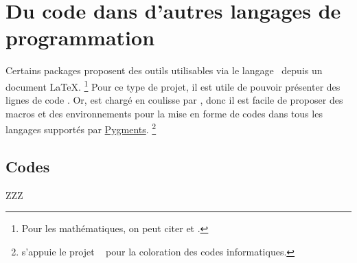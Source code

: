 \documentclass{tutodoc}
\begin{document}
\section{Du code dans d'autres langages de programmation}

Certains packages proposent des outils utilisables via le langage \lua\ depuis un document \LaTeX.%
\footnote{
	Pour les mathématiques, on peut citer  et .
}
Pour ce type de projet, il est utile de pouvoir présenter des lignes de code \lua. Or,  est chargé en coulisse par \thisproj, donc il est facile de proposer des macros et des environnements pour la mise en forme de codes dans tous les langages supportés par \href{https://pygments.org/}{Pygments}.%
\footnote{
	 s'appuie le projet \python\  pour la coloration des codes informatiques.
}



\subsection{Codes }

ZZZ
\end{document}

